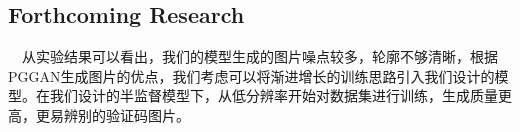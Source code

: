 \documentclass[portrait]{a0poster}
\begin{document}
\begin{multicols}{2}
\begin{CJK}{UTF8}{gbsn}
\end{CJK}

\color{DarkSlateGray} %

\begin{CJK}{UTF8}{gbsn}
\section*{Forthcoming Research}

\ \ 从实验结果可以看出，我们的模型生成的图片噪点较多，轮廓不够清晰，根据PGGAN生成图片的优点，我们考虑可以将渐进增长的训练思路引入我们设计的模型。在我们设计的半监督模型下，从低分辨率开始对数据集进行训练，生成质量更高，更易辨别的验证码图片。

\end{CJK}
\printbibliography[title={References}]



\end{multicols}
\end{document}
